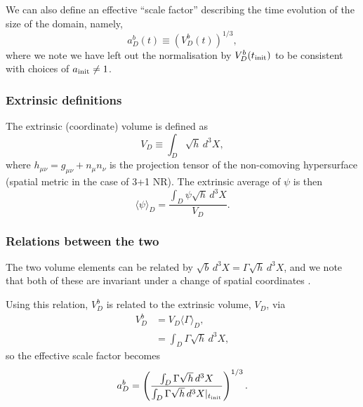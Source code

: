 \documentclass[a4paper]{article}
\newcommand{\Gam}{\Gamma}
\begin{document}
We can also define an effective ``scale factor'' describing the time evolution of the size of the domain, namely,
\begin{equation}
	a_D^b(t) \equiv \left( V_D^b(t) \right)^{1/3},
\end{equation}
where we note we have left out the normalisation by $V_D^b(t_{\rm init})$ to be consistent with choices of $a_{\rm init}\neq 1$.


\subsubsection{Extrinsic definitions}

The extrinsic (coordinate) volume is defined as
\begin{equation}
	V_D \equiv \int_D \sqrt{h}\, d^3X,
\end{equation}
where $h_{\mu\nu}=g_{\mu\nu} + n_\mu n_\nu$ is the projection tensor of the non-comoving hypersurface (spatial metric in the case of 3+1 NR).
The extrinsic average of $\psi$ is then
\begin{equation} \label{eq:avgusual}
	\langle\psi\rangle_D = \frac{\int_D \psi \sqrt{h}\, d^3 X}{V_D}.
\end{equation}


\subsubsection{Relations between the two}

The two volume elements can be related by $\sqrt{b}\, d^3X = \Gam \sqrt{h}\, d^3X$, and we note that both of these are invariant under a change of spatial coordinates \citep[see p.35, footnote 15 in][]{Buchert2020}.

Using this relation, $V_D^b$ is related to the extrinsic volume, $V_D$, via
\begin{align}
	V^b_D &= V_D \langle\Gam\rangle_D, \\
		   &= \int_D \Gam \sqrt{h} \,d^3X,
\end{align}
so the effective scale factor becomes
\begin{equation}
	a_D^b = \left( \frac{ \int_D \Gam \sqrt{h} \,d^3X } {\int_D \Gam \sqrt{h} \,d^3X |_{t_{\rm init}}} \right)^{1/3}.
\end{equation}
\end{document}
